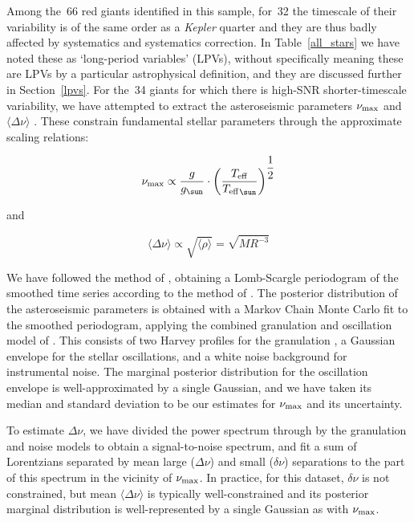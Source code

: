 \documentclass[a4paper,fleqn,usenatbib]{mnras}
\newcommand{\numax}{\mbox{$\nu_{\rm max}$}\xspace}
\newcommand{\Dnu}{\mbox{$\Delta \nu$}\xspace}
\newcommand{\dnu}{\mbox{$\delta \nu$}\xspace}
\newcommand{\teff}{\mbox{$T_{\rm eff}$}\xspace}
\newcommand{\kepler}{\emph{Kepler}\xspace}
\begin{document}
Among the~66 red giants identified in this sample, for~32 the timescale of their variability is of the same order as a \kepler quarter and they are thus badly affected by systematics and systematics correction. In Table~\ref{all_stars} we have noted these as `long-period variables' (LPVs), without specifically meaning these are LPVs by a particular astrophysical definition, and they are discussed further in Section~\ref{lpvs}. For the~34 giants for which there is high-SNR shorter-timescale variability, we have attempted to extract the asteroseismic parameters \numax and $\langle \Dnu \rangle$ \citep{KB95,2013ARA&A..51..353C}. These constrain fundamental stellar parameters through the approximate scaling relations: 

\begin{equation}
\label{scaling}
\numax \propto \dfrac{g}{g_{\sun}} \cdot \left(\dfrac{\teff}{\teff_{\sun}}\right)^{\dfrac{1}{2}}
\end{equation}

and

\begin{equation}
\langle \Dnu \rangle \propto \sqrt{\langle \rho \rangle} = \sqrt{M {R}^{-3}}
\end{equation}

We have followed the method of \citet{2016AN....337..774D}, obtaining a Lomb-Scargle periodogram of the smoothed time series according to the method of \citet{2011MNRAS.414L...6G}. The posterior distribution of the asteroseismic parameters is obtained with a Markov Chain Monte Carlo fit to the smoothed periodogram, applying the combined granulation and oscillation model of \citet{2014A&A...570A..41K}. This consists of two Harvey profiles for the granulation \citep{1985ESASP.235..199H}, a Gaussian envelope for the stellar oscillations, and a white noise background for instrumental noise. The marginal posterior distribution for the oscillation envelope is well-approximated by a single Gaussian, and we have taken its median and standard deviation to be our estimates for \numax and its uncertainty.

To estimate \Dnu, we have divided the power spectrum through by the granulation and noise models to obtain a signal-to-noise spectrum, and fit a sum of Lorentzians separated by mean large (\Dnu) and small (\dnu) separations to the part of this spectrum in the vicinity of \numax. In practice, for this dataset, \dnu is not constrained, but mean $\langle \Dnu \rangle$ is typically well-constrained and its posterior marginal distribution is well-represented by a single Gaussian as with \numax. 
\end{document}
